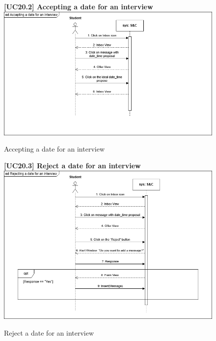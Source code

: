 \begin{figure}[H]
\textbf{[UC20.2] Accepting a date for an interview}\newline\newline
\includegraphics[width=15cm]{Images/UC_diagram/RASD-UC19.drawio.png}
    \caption{Accepting a date for an interview}
\end{figure}

\begin{figure}[H]
\textbf{[UC20.3] Reject a date for an interview}\newline\newline
\includegraphics[width=15cm]{Images/UC_diagram/RASD-UC20.drawio.png}
    \caption{Reject a date for an interview}
\end{figure}

